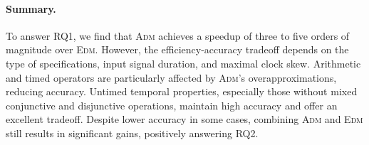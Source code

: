 \paragraph*{Summary.}
To answer RQ1, we find that \textsc{Adm} achieves a speedup of three to five orders of magnitude over \textsc{Edm}. However, the efficiency-accuracy tradeoff depends on the type of specifications, input signal duration, and maximal clock skew. Arithmetic and timed operators are particularly affected by \textsc{Adm}'s overapproximations, reducing accuracy. Untimed temporal properties, especially those without mixed conjunctive and disjunctive operations, maintain high accuracy and offer an excellent tradeoff. Despite lower accuracy in some cases, combining \textsc{Adm} and \textsc{Edm} still results in significant gains, positively answering RQ2.

